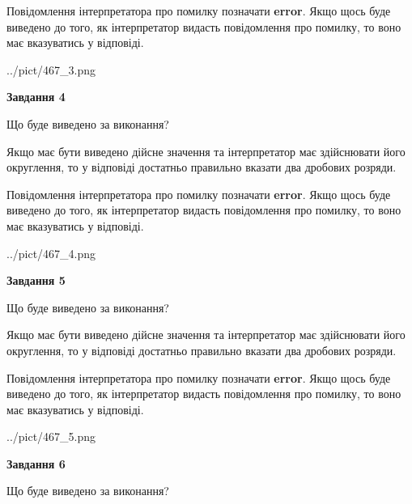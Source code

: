 \documentclass[12pt, ukrainian]{article}
\begin{document}
{\begin {Large}
Повідомлення інтерпретатора про помилку позначати \textbf{error}.
Якщо щось буде виведено до того, як інтерпретатор видасть повідомлення про помилку, 
то воно має вказуватись у відповіді. \par

\begin{center}
	{../pict/467_3.png}
\end{center}
\newpage

{\begin {center}\textbf{Завдання 4}\end {center}}\par
Що буде виведено за виконання? \par

Якщо має бути виведено дійсне значення та інтерпретатор має здійснювати його округлення, 
то у відповіді достатньо правильно вказати два дробових розряди.

Повідомлення інтерпретатора про помилку позначати \textbf{error}.
Якщо щось буде виведено до того, як інтерпретатор видасть повідомлення про помилку, 
то воно має вказуватись у відповіді. \par

\begin{center}
	{../pict/467_4.png}
\end{center}
\newpage

{\begin {center}\textbf{Завдання 5}\end {center}}\par
Що буде виведено за виконання? \par

Якщо має бути виведено дійсне значення та інтерпретатор має здійснювати його округлення, 
то у відповіді достатньо правильно вказати два дробових розряди.

Повідомлення інтерпретатора про помилку позначати \textbf{error}.
Якщо щось буде виведено до того, як інтерпретатор видасть повідомлення про помилку, 
то воно має вказуватись у відповіді. \par

\begin{center}
	{../pict/467_5.png}
\end{center}
\newpage

{\begin {center}\textbf{Завдання 6}\end {center}}\par
Що буде виведено за виконання? \par


\end{Large}}
\end{document}

